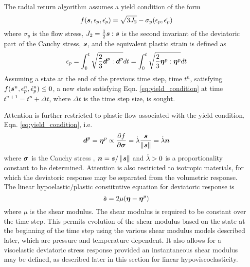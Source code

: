 The radial return algorithm assumes a yield condition of the form 
  \begin{equation}\label{eq:yield_condition}
    f(\Bs,\Ep,\dot{\Ep}) = \sqrt{3J_2} - \sigma_y(\Ep,\dot{\Ep})
  \end{equation}
where $\sigma_y$ is the flow stress, $J_2 = {1\over2}\Bs:\Bs$ is the
second invariant of the deviatoric part of the Cauchy stress, $\Bs$,
and the equivalent plastic strain is defined as
  \begin{equation}\label{eq:ep}
    \Ep = \int_0^t\sqrt{{2\over3}\Bd^p:\Bd^p}dt = \int_0^t\sqrt{{2\over3}\Beta^p:\Beta^p}dt
  \end{equation}
Assuming a state at the end of the previous time step, time $t^n$,
satisfying $f(\Bs^n,\Ep^n,\Epdot{}^n)\le0$, a new state satisfying
Eqn. \ref{eq:yield_condition} at time $t^{n+1}=t^n+\Delta t$, where
$\Delta t$ is the time step size, is sought.

Attention is further restricted to plastic flow associated with the yield condition,
Eqn. \ref{eq:yield_condition}, i.e.
  \begin{equation}\label{eq:associated_flow}
    \Bd^p = \Beta^p \propto \Partial{f}{\Bsig} = \lambdadot{\Bs\over\norm{\Bs}} = \lambdadot\Bn
  \end{equation}
where $\Bsig$ is the Cauchy stress , $\Bn={\Bs/\norm{\Bs}}$ and
$\lambdadot>0$ is a proportionality constant to be determined.
Attention is also restricted to isotropic materials, for which the
deviatoric response may be separated from the volumetric response.
The linear hypoelastic/plastic constitutive equation for deviatoric
response is
  \begin{equation}\label{eq:linearhypoelasticity}
    \dot{\Bs} = 2\mu(\Beta - \Beta^p)
  \end{equation}
where $\mu$ is the shear modulus.  The shear modulus is required to be
constant over the time step.  This permits evolution of the shear
modulus based on the state at the beginning of the time step using the
various shear modulus models described later, which are pressure and
temperature dependent.  It also allows for a visoelastic deviatoric
stress response provided an instantaneous shear modulus may be
defined, as described later in this section for linear
hypoviscoelasticity.

